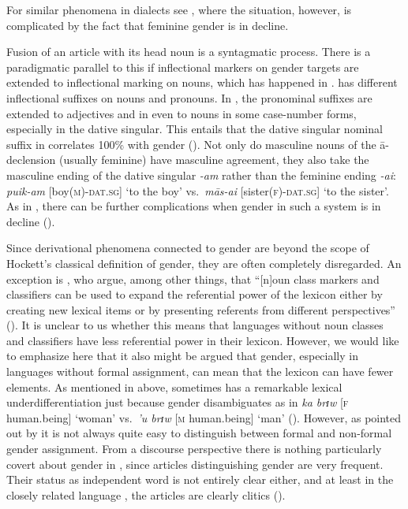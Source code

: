 \documentclass[output=collectionpaper]{langsci/langscibook}
\begin{document}
For similar phenomena in  dialects see \cite{Enger2012}, where the situation, however, is complicated by the fact that feminine gender is in decline.

Fusion of an article with its head noun is a syntagmatic process. There is a paradigmatic parallel to this if inflectional markers on gender targets are extended to inflectional marking on nouns, which has happened in .  has different inflectional suffixes on nouns and pronouns. In , the pronominal suffixes are extended to adjectives and in  even to nouns in some case-number forms, especially in the dative singular. This entails that the dative singular nominal suffix in  correlates 100\% with gender (\citealt{Nau2011}). Not only do masculine nouns of the ā-declension (usually feminine) have masculine agreement, they also take the masculine ending of the dative singular \textit{-am} rather than the feminine ending \textit{-ai}: \textit{puik-am} [boy\textsc{(m)-dat.sg}] `to the boy' vs.\ \textit{mās-ai} [sister\textsc{(f)-dat.sg}] `to the sister'. As in , there can be further complications when gender in such a system is in decline (\citealt{Waelchli2017}).

Since derivational phenomena connected to gender are beyond the scope of Hockett's classical definition of gender, they are often completely disregarded. An exception is \cite{Contini-Morava2013}, who argue, among other things, that ``[n]oun class markers and classifiers can be used to expand the referential power of the lexicon either by creating new lexical items or by presenting referents from different perspectives'' (\citealt[263]{Contini-Morava2013}). It is unclear to us whether this means that languages without noun classes and classifiers have less referential power in their lexicon. However, we would like to emphasize here that it also might be argued that gender, especially in languages without formal assignment, can mean that the lexicon can have fewer elements. As mentioned in  above,  sometimes has a remarkable lexical underdifferentiation just because gender disambiguates as in \textit{ka brɪw} [\textsc{f} human.being] `woman' vs.\ \textit{'u brɪw} [\textsc{m} human.being] `man' (\citealt[270]{Rabel-Heymann1977}). However, as pointed out by  it is not always quite easy to distinguish between formal and non-formal gender assignment. From a discourse perspective there is nothing particularly covert about gender in , since articles distinguishing gender are very frequent. Their status as independent word is not entirely clear either, and at least in the closely related language , the articles are clearly clitics (\citealt{Ring2015}).
\end{document}
